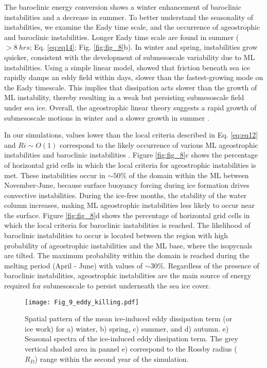 \documentclass[draft]{agujournal2019}
\begin{document}
The baroclinic energy conversion shows a winter enhancement of baroclinic instabilities and a decrease in summer. To better understand the seasonality of instabilities, we examine the Eady time scale, and the occurrence of ageostrophic and baroclinic instabilities. Longer Eady time scale are found in summer ($>8\ hrs$; Eq. \ref{eq:eq14}; Fig. \ref{fig:fig_8}b). In winter and spring, instabilities grow quicker, consistent with the development of submesoscale variability due to ML instabilities. Using a simple linear model, \citet{Ou_dissipation_1986} showed that friction beneath sea ice rapidly damps an eddy field within days, slower than the fastest-growing mode on the Eady timescale. This implies that dissipation acts slower than the growth of ML instability, thereby resulting in a weak but persisting submesoscale field under sea ice. Overall, the ageostrophic linear theory suggests a rapid growth of submesoscale motions in winter and a slower growth in summer \citep{FoxKemper_eddies_2008}.

In our simulations, values lower than the local criteria described in Eq. \ref{eq:eq12} and $Ri \sim O(1)$ correspond to the likely occurrence of various ML ageostrophic instabilities and baroclinic instabilities \citep{Thomas_symmetric_2013,Haine_instability_1998}. Figure \ref{fig:fig_8}c shows the percentage of horizontal grid cells in which the local criteria for ageostrophic instabilities is met. These instabilities occur in $\sim 50\%$ of the domain within the ML between November-June, because surface buoyancy forcing during ice formation drives convective instabilities. During the ice-free months, the stability of the water column increases, making ML ageostrophic instabilities less likely to occur near the surface. Figure \ref{fig:fig_8}d shows the percentage of horizontal grid cells in which the local criteria for baroclinic instabilities is reached. The likelihood of baroclinic instabilities to occur is located between the region with high probability of ageostrophic instabilities and the ML base, where the isopycnals are tilted. The maximum probability within the domain is reached during the melting period (April - June) with values of $\sim 30\%$. Regardless of the presence of baroclinic instabilities, ageostrophic instabilities are the main source of energy required for submesoscale to persist underneath the sea ice cover.

\begin{figure}[t!]
  \texttt{[image: Fig\_9\_eddy\_killing.pdf]}
  \caption{Spatial pattern of the mean ice-induced eddy dissipation term (or ice work) for a) winter, b) spring, c) summer, and d) autumn. e) Seasonal spectra of the ice-induced eddy dissipation term. The grey vertical shaded area in pannel e) correspond to the Rossby radius ($R_D$) range within the second year of the simulation.}
  \label{fig:fig_9}
\end{figure}
\end{document}
